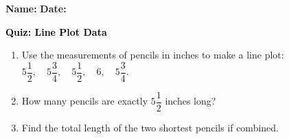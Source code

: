 \documentclass[12pt, letterpaper, fleqn]{article}
\begin{document}
\textbf{Name:} \underline{\hspace{5cm}}
\hfill
\textbf{Date:} \underline{\hspace{3cm}}\\

\begin{tcolorbox}[colback=customteal!20]
    \large\textcolor{black}{\textbf{Quiz: Line Plot Data}}
\end{tcolorbox}
\begin{enumerate}[itemsep=3.5cm, leftmargin=0.6cm]
\item Use the measurements of pencils in inches to make a line plot: $5\dfrac{1}{2}, \quad 5\dfrac{3}{4}, \quad 5\dfrac{1}{2}, \quad 6, \quad 5\dfrac{3}{4}$.
\vspace{4cm}
\item How many pencils are exactly $5\dfrac{1}{2}$ inches long?
\vspace{3cm}
\item Find the total length of the two shortest pencils if combined.
\end{enumerate}
\end{document}

